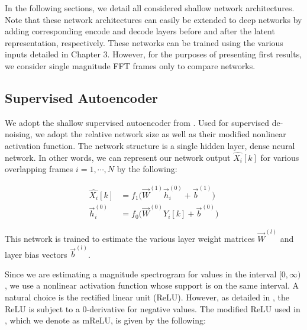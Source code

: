 In the following sections, we detail all considered shallow network architectures. Note that these network architectures can easily be extended to deep networks by adding corresponding encode and decode layers before and after the latent representation, respectively. These networks can be trained using the various inputs detailed in Chapter 3. However, for the purposes of presenting first results, we consider single magnitude FFT frames only to compare networks. %


\subsection{Supervised Autoencoder}

We adopt the shallow supervised autoencoder from \cite{liu2014experiments}. Used for supervised de-noising, we adopt the relative network size as well as their modified nonlinear activation function. The network structure is a single hidden layer, dense neural network. In other words, we can represent our network output $\hat{X_i}[k]$ for various overlapping frames $i=1,\cdots,N$ by the following:


\begin{align}
\hat{X_i}[k] &= f_1 \big( \vec{W}^{(1)} \vec{h}_i^{(0)} + \vec{b}^{(1)} \big)\\
\vec{h}_i^{(0)} &= f_0 \big( \vec{W}^{(0)} Y_i[k] + \vec{b}^{(0)} \big)
\end{align}


This network is trained to estimate the various layer weight matrices $\vec{W}^{(l)}$ and layer bias vectors $\vec{b}^{(l)}$.

Since we are estimating a magnitude spectrogram for values in the interval $[0,\infty)$, we use a nonlinear activation function whose support is on the same interval. A natural choice is the rectified linear unit (ReLU). However, as detailed in \cite{liu2014experiments}, the ReLU is subject to a 0-derivative for negative values. The modified ReLU used in \cite{liu2014experiments}, which we denote as mReLU, is given by the following:

